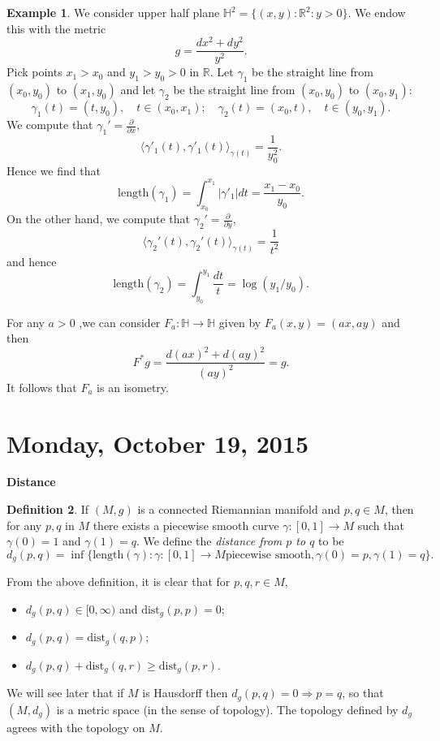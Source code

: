\documentclass{amsart}
\numberwithin{equation}{section}
\newcommand{\bR}{\mathbb{R}}
\theoremstyle{definition}
\newtheorem{definition}{Definition} [section]
\newtheorem{example}[definition]{Example}
\theoremstyle{theorem}
\begin{document}
\begin{example}
We consider upper half plane $\mathbb{H}^2 = \{(x,y) : \bR^2 : y > 0\}$. We endow this with the metric 
\[
g = \frac{dx^2 + dy^2}{y^2}.
\]
Pick points $x_1 > x_0$ and $y_1 > y_0 > 0$ in $\bR$. Let $\gamma_1$ be the straight line from $(x_0, y_0)$ to $(x_1, y_0)$ 
and let $\gamma_2$ be the straight line from $(x_0, y_0)$ to $(x_0, y_1)$:
$$
\gamma_1(t) = (t,y_0),\quad t\in (x_0,x_1);\quad
\gamma_2(t)=  (x_0,t),\quad t\in (y_0, y_1).
$$
We compute that $\gamma_1'=\frac{\partial}{\partial x}$, 
\[
\langle \gamma'_1(t), \gamma'_1(t) \rangle_{\gamma(t)} = \frac{1}{y_0^2}.
\]
Hence we find that 
\[
\text{length}(\gamma_1) = \int_{x_0}^{x_1} |\gamma'_1| dt = \frac{x_1 - x_0}{y_0}. 
\]
On the other hand, we compute that  $\gamma_2'=\frac{\partial}{\partial y}$, 
\[
\langle \gamma_2'(t), \gamma_2'(t) \rangle_{\gamma(t)}  = \frac{1}{t^2}
\]
and hence 
\[
\text{length}(\gamma_2) = \int_{y_0}^{y_1} \frac{dt}{t} = \log(y_1/y_0). 
\]

For any $a > 0$ ,we can consider $F_a : \mathbb{H} \to \mathbb{H}$ given by $F_a(x,y) = (ax,ay)$ and then 
\[
F^*g = \frac{d(ax)^2 + d(ay)^2}{(ay)^2} = g. 
\]
It follows that $F_a$ is an isometry. 
\end{example}






\section{Monday, October 19, 2015} 

\noindent
{\bf \large Distance}

\begin{definition}
If $(M,g)$ is a connected Riemannian manifold and $p,q \in M$, 
then for any $p,q$ in $M$ there exists a piecewise smooth curve $\gamma:[0,1]\to M$ such that
$\gamma(0)=1$ and $\gamma(1)=q$. We define the {\em distance from $p$ to $q$} to be 
\[
d_g(p,q) = \inf\{
\text{length}(\gamma) : \gamma : [0,1] \to M \text{piecewise smooth}, \gamma(0) = p, \gamma(1) = q\}.
\]
\end{definition}

From the above definition, it is clear that for $p,q,r\in M$,
\begin{itemize}
\item $d_g(p,q) \in [0,\infty)$ and $\text{dist}_g(p,p)=0$;
\item $d_g(p,q)=\text{dist}_g(q,p)$;
\item $d_g(p,q) + \text{dist}_g(q,r) \geq \text{dist}_g(p,r)$. 
\end{itemize}
We will see later that if $M$ is Hausdorff then $d_g(p,q)=0\Rightarrow p=q$, so that
$(M,d_g)$ is a metric space (in the sense of topology). The topology defined
by $d_g$ agrees with the topology on $M$. 
\end{document}
